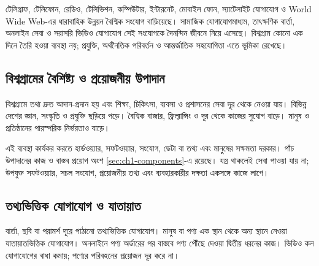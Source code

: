 \begin{topicbody}
টেলিগ্রাফ, টেলিফোন, রেডিও, টেলিভিশন, কম্পিউটার, ইন্টারনেট, মোবাইল ফোন, স্যাটেলাইট যোগাযোগ ও World Wide Web-এর ধারাবাহিক উন্নয়ন বৈশ্বিক সংযোগ বাড়িয়েছে। সামাজিক যোগাযোগমাধ্যম, তাৎক্ষণিক বার্তা, অনলাইন সেবা ও সরাসরি ভিডিও যোগাযোগ সেই সংযোগকে দৈনন্দিন জীবনে নিয়ে এসেছে। বিশ্বগ্রাম কোনো এক দিনে তৈরি হওয়া ব্যবস্থা নয়; প্রযুক্তি, অর্থনৈতিক পরিবর্তন ও আন্তর্জাতিক সহযোগিতা এতে ভূমিকা রেখেছে।

\subsection{বিশ্বগ্রামের বৈশিষ্ট্য ও প্রয়োজনীয় উপাদান}
বিশ্বগ্রামে তথ্য দ্রুত আদান-প্রদান হয় এবং শিক্ষা, চিকিৎসা, ব্যবসা ও প্রশাসনের সেবা দূর থেকে নেওয়া যায়। বিভিন্ন দেশের জ্ঞান, সংস্কৃতি ও প্রযুক্তি ছড়িয়ে পড়ে। বৈশ্বিক বাজার, ফ্রিল্যান্সিং ও দূর থেকে কাজের সুযোগ বাড়ে। মানুষ ও প্রতিষ্ঠানের পারস্পরিক নির্ভরতাও বাড়ে।

এই ব্যবস্থা কার্যকর করতে হার্ডওয়্যার, সফটওয়্যার, সংযোগ, ডেটা বা তথ্য এবং মানুষের সক্ষমতা দরকার। পাঁচ উপাদানের কাজ ও বাস্তব প্রয়োগ অংশ \ref{sec:ch1-components}-এ রয়েছে। যন্ত্র থাকলেই সেবা পাওয়া যায় না; উপযুক্ত সফটওয়্যার, সচল সংযোগ, প্রয়োজনীয় তথ্য এবং ব্যবহারকারীর দক্ষতা একসঙ্গে কাজে লাগে।

\subsection{তথ্যভিত্তিক যোগাযোগ ও যাতায়াত}
বার্তা, ছবি বা পরামর্শ দূরে পাঠানো তথ্যভিত্তিক যোগাযোগ। মানুষ বা পণ্য এক স্থান থেকে অন্য স্থানে নেওয়া যাতায়াতভিত্তিক যোগাযোগ। অনলাইনে পণ্য অর্ডারের পর বাস্তবে পণ্য পৌঁছে দেওয়া দ্বিতীয় ধরনের কাজ। ভিডিও কল যোগাযোগের বাধা কমায়; পণ্যের পরিবহনের প্রয়োজন দূর করে না।


\end{topicbody}
